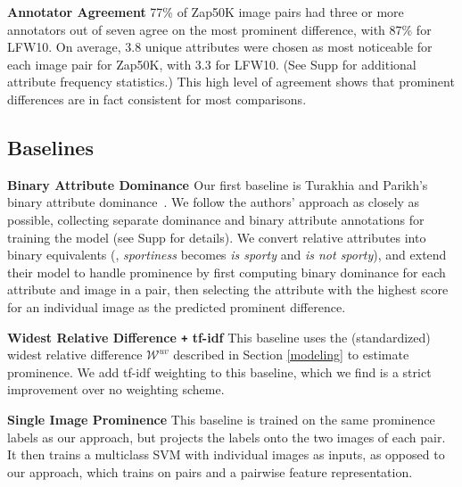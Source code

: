 \documentclass[10pt,twocolumn,letterpaper]{article}
\begin{document}
\noindent \textbf{Annotator Agreement} \hspace{1em} 77\% of Zap50K image pairs had three or more annotators out of seven agree on the most prominent difference, with 87\% for LFW10. On average, 3.8 unique attributes were chosen as most noticeable for each image pair for Zap50K, with 3.3 for LFW10. (See Supp for additional attribute frequency statistics.) This high level of agreement shows that prominent differences are in fact consistent for most comparisons.

\subsection{Baselines} \label{baselines}

\noindent \textbf{Binary Attribute Dominance \cite{dominance}} \hspace{1em} Our first baseline is Turakhia and Parikh's binary attribute dominance~\cite{dominance}. We follow the authors' approach as closely as possible, collecting separate dominance and binary attribute annotations for training the model (see Supp for details). We convert relative attributes into binary equivalents (\eg, \textit{sportiness} becomes \textit{is sporty} and \textit{is not sporty}), and extend their model to handle prominence by first computing binary dominance for each attribute and image in a pair, then selecting the attribute with the highest score for an individual image as the predicted prominent difference.

\vspace{0.22cm}

\noindent \textbf{Widest Relative Difference \texttt{+} tf-idf} \hspace{1em} This baseline uses the (standardized) widest relative difference $\mathcal{W}^{uv}$ described in Section \ref{modeling} to estimate prominence. We add tf-idf weighting to this baseline, which we find is a strict improvement over no weighting scheme.%

\vspace{0.22cm}

\noindent \textbf{Single Image Prominence} \hspace{1em} This baseline is trained on the same prominence labels as our approach, but projects the labels onto the two images of each pair. It then trains a multiclass SVM with individual images as inputs, as opposed to our approach, which trains on pairs and a pairwise feature representation.
\end{document}
